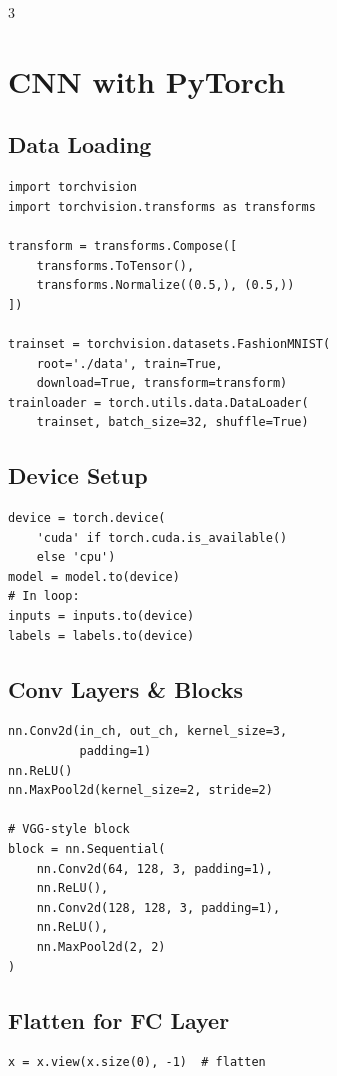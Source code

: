 \documentclass[6pt,landscape,a4paper]{extarticle}
\begin{document}
\newpage

\begin{multicols}{3}

\section{CNN with PyTorch}

\subsection{Data Loading}
\begin{lstlisting}
import torchvision
import torchvision.transforms as transforms

transform = transforms.Compose([
    transforms.ToTensor(),
    transforms.Normalize((0.5,), (0.5,))
])

trainset = torchvision.datasets.FashionMNIST(
    root='./data', train=True,
    download=True, transform=transform)
trainloader = torch.utils.data.DataLoader(
    trainset, batch_size=32, shuffle=True)
\end{lstlisting}

\subsection{Device Setup}
\begin{lstlisting}
device = torch.device(
    'cuda' if torch.cuda.is_available()
    else 'cpu')
model = model.to(device)
# In loop:
inputs = inputs.to(device)
labels = labels.to(device)
\end{lstlisting}

\subsection{Conv Layers \& Blocks}
\begin{lstlisting}
nn.Conv2d(in_ch, out_ch, kernel_size=3,
          padding=1)
nn.ReLU()
nn.MaxPool2d(kernel_size=2, stride=2)

# VGG-style block
block = nn.Sequential(
    nn.Conv2d(64, 128, 3, padding=1),
    nn.ReLU(),
    nn.Conv2d(128, 128, 3, padding=1),
    nn.ReLU(),
    nn.MaxPool2d(2, 2)
)
\end{lstlisting}

\subsection{Flatten for FC Layer}
\begin{lstlisting}
x = x.view(x.size(0), -1)  # flatten
\end{lstlisting}


\end{multicols}
\end{document}
